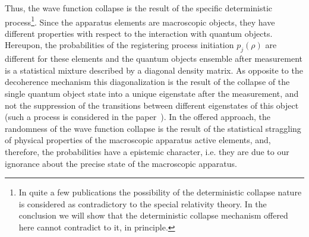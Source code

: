 Thus, the wave function collapse is the result of the specific deterministic process\footnote{In quite a few publications the possibility of the deterministic collapse nature is considered as contradictory to the special relativity theory. In the conclusion we will show that the deterministic collapse mechanism offered here cannot contradict to it, in principle.}\!\!. Since the apparatus elements are macroscopic objects, they have different properties with respect to the interaction with quantum objects. Hereupon, the probabilities of the registering process initiation $p_j(\rho)$ are different for these elements and the quantum objects ensemble after measurement is a statistical mixture described by a diagonal density matrix. As opposite to the decoherence mechanism this diagonalization is the result of the collapse of the single quantum object state into a unique eigenstate after the measurement, and not the suppression of the transitions between different eigenstates of this object (such a process is considered in the paper~\cite{bib:5}). In the offered approach, the randomness of the wave function collapse is the result of the statistical straggling of physical properties of the macroscopic apparatus active elements, and, therefore, the probabilities have a epistemic character, i.e. they are due to our ignorance about the precise state of the macroscopic apparatus. 
 
\smallskip 
 
